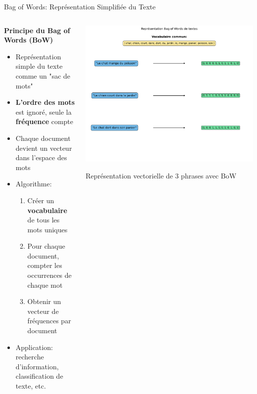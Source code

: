 \documentclass[aspectratio=169,11pt]{beamer}
\begin{document}
\begin{frame}{Bag of Words: Représentation Simplifiée du Texte}
    \begin{columns}
        \begin{column}{0.55\textwidth}
            \textbf{Principe du Bag of Words (BoW)}
            \begin{itemize}
                \item Représentation simple du texte comme un "sac de mots"
                \item \textbf{L'ordre des mots} est ignoré, seule la \textbf{fréquence} compte
                \item Chaque document devient un vecteur dans l'espace des mots
                \item Algorithme:
                \begin{enumerate}
                    \item Créer un \textbf{vocabulaire} de tous les mots uniques
                    \item Pour chaque document, compter les occurrences de chaque mot
                    \item Obtenir un vecteur de fréquences par document
                \end{enumerate}
                \item Application: recherche d'information, classification de texte, etc.
            \end{itemize}
        \end{column}
        \begin{column}{0.45\textwidth}
            \includegraphics[width=\textwidth]{images/generated/bag_of_words.png}
            \vspace{-0.3cm}
            \begin{center}
                \small{Représentation vectorielle de 3 phrases avec BoW}
            \end{center}
        \end{column}
    \end{columns}
\end{frame}
\end{document}
